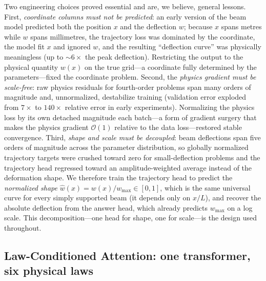 \documentclass[11pt,a4paper]{article}
\begin{document}
Two engineering choices proved essential and are, we believe, general
lessons. First, \emph{coordinate columns must not be predicted}: an early
version of the beam model predicted both the position $x$ and the deflection
$w$; because $x$ spans metres while $w$ spans millimetres, the trajectory
loss was dominated by the coordinate, the model fit $x$ and ignored $w$, and
the resulting ``deflection curve'' was physically meaningless (up to
$\sim6\times$ the peak deflection). Restricting the output to the physical
quantity $w(x)$ on the true grid---a coordinate fully determined by the
parameters---fixed the coordinate problem. Second, the
\emph{physics gradient must be scale-free}: raw physics residuals for
fourth-order problems span many orders of magnitude and, unnormalized,
destabilize training (validation error exploded from $7\times$ to
$140\times$ relative error in early experiments). Normalizing the physics
loss by its own detached magnitude each batch---a form of gradient surgery
that makes the physics gradient $\mathcal{O}(1)$ relative to the data
loss---restored stable convergence. Third, \emph{shape and scale must be
decoupled}: beam deflections span five orders of magnitude across the
parameter distribution, so globally normalized trajectory targets were
crushed toward zero for small-deflection problems and the trajectory head
regressed toward an amplitude-weighted average instead of the deformation
shape. We therefore train the trajectory head to predict the
\emph{normalized shape} $\hat w(x)=w(x)/w_{\max}\in[0,1]$, which is the
same universal curve for every simply supported beam (it depends only on
$x/L$), and recover the absolute deflection from the answer head, which
already predicts $w_{\max}$ on a log scale. This decomposition---one head
for shape, one for scale---is the design used throughout.

\subsection{Law-Conditioned Attention: one transformer, six physical laws}\label{sec:lca}
\end{document}
